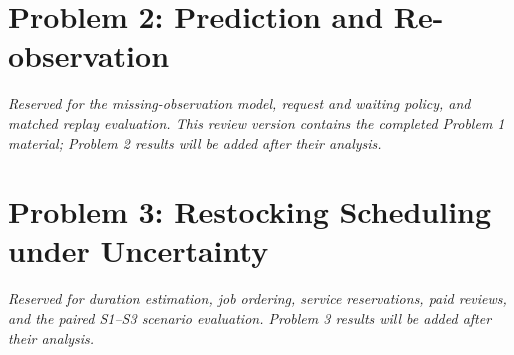 \FloatBarrier
\section{Problem 2: Prediction and Re-observation}
\label{sec:problem2}
\textit{Reserved for the missing-observation model, request and waiting policy, and matched replay evaluation. This review version contains the completed Problem 1 material; Problem 2 results will be added after their analysis.}

\section{Problem 3: Restocking Scheduling under Uncertainty}
\label{sec:problem3}
\textit{Reserved for duration estimation, job ordering, service reservations, paid reviews, and the paired S1--S3 scenario evaluation. Problem 3 results will be added after their analysis.}

